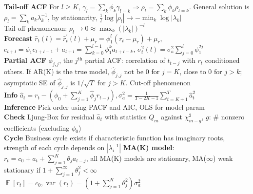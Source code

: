\documentclass[10pt,landscape, a4paper]{article}
\theoremstyle{remark}
\newcommand{\var}{\operatorname{var}}
\newcommand{\E}{\operatorname{\mathbb{E}}}
\newcommand{\abs}[1]{\left\lvert #1 \right\rvert}
\begin{document}
\begin{multicols*}{3}
\textbf{Tail-off ACF} For $l \geq K$, $\gamma_l = \sum_k \phi_k \gamma_{l=k}\Rightarrow \rho_l = \sum_k \phi_k \rho_{l=k}$. General solution is $\rho_l = \sum_k a_k \lambda^{-1}_k$, by stationarity, $\frac{1}{l} \log \abs{\rho_l} \to - \min_k \log \abs{\lambda_k}$\\
Tail-off phenomenon: $\rho_l \to 0 \approx \max_k (\abs{\lambda_k})^{-l}$\\
\textbf{Forecast} $\hat{r}_t (l) = \hat{r}^\prime_t (l) + \mu_r = \phi^l_1 (r_t -\mu_r) + \mu_r$,
$e_{t+l} = \phi_1 e_{t+l-1} + a_{t+l} = \sum^{l-1}_{k=0} \phi^k_1 a_{t+l-k}$, $\sigma^2_t (l) = \sigma^2_a \sum_{j=0}^{l} \phi^{2j}_1$\\
\textbf{Partial ACF} $\phi_{j, j}$, the $j^{\text{th}}$ partial ACF: correlation of $t_{t-j}$ with $r_t$ conditioned others. If AR(K) is the true model, $\hat{\phi}_{j,j}$ not be 0 for $j=K$, close to 0 for $j > k$; asymptotic SE of $\hat{\phi}_{j,j}$ is $1/\sqrt{T}$ for $j>K$. Cut-off phenomenon\\
\textbf{Info} $\hat{a}_t = r_t - (\phi_0 + \sum^K_{j=1}\hat{\phi}_j r_{t-j}), \sigma^2_a = \frac{1}{T-2K-1} \sum^T_{t=K+1} \hat{a}^2_t$\\
\textbf{Inference} Pick order using PACF and AIC, OLS for model param\\
\textbf{Check} Ljung-Box for residual $\hat{a}_t$ with statistics $Q_m$ against $\chi^2_{m-g}$, $g$: \# nonzero coefficients (excluding $\phi_0$)\\
\textbf{Cycle} Business cycle exists if characteristic function has imaginary roots, strength of each cycle depends on $\abs{\lambda^{-1}_i}$
\newline
\textbf{MA(K) model}: $r_t = c_0 + a_t +\sum^K_{j=1} \theta_j a_{t-j}$, all MA(K) models are stationary, MA($\infty$) weak stationary if $1 + \sum^{\infty}_{j=1} \theta^2_j < \infty$\\
$\E [r_t] = c_0, \var (r_t) = (1+\sum^K_{j=1}\theta^2_j ) \sigma^2_a$\\

\end{multicols*}
\end{document}
